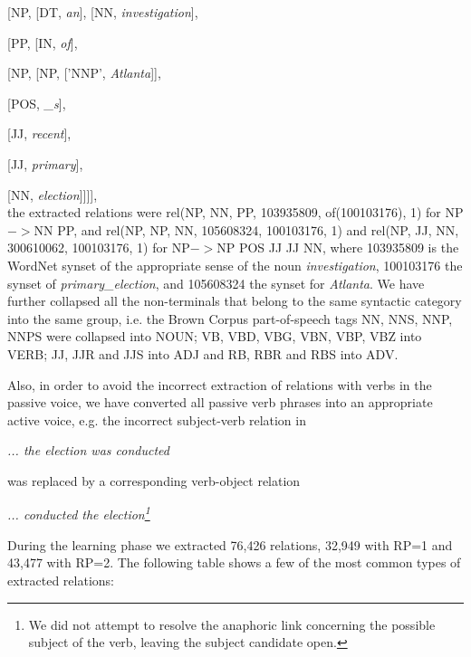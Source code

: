 \hspace*{2cm}
        [NP, [DT, {\it an}], [NN, {\it investigation}],

\hspace*{2cm}\hspace*{2cm}
                [PP, [IN, {\it of}],

\hspace*{2cm}\hspace*{2cm}\hspace*{2cm}
                        [NP, [NP, ['NNP', {\it Atlanta}]],

\hspace*{2cm}\hspace*{2cm}\hspace*{2cm}
                        [POS, {\it \_s}],

\hspace*{2cm}\hspace*{2cm}\hspace*{2cm}
                        [JJ, {\it recent}],

\hspace*{2cm}\hspace*{2cm}\hspace*{2cm}
                        [JJ, {\it primary}],

\hspace*{2cm}\hspace*{2cm}\hspace*{2cm}
                        [NN, {\it election}]]]],\\


\noindent
the extracted relations were rel(NP, NN, PP, 103935809, of(100103176), 1) for NP$->$NN PP, and
rel(NP, NP, NN, 105608324, 100103176, 1) and rel(NP, JJ, NN, 300610062, 100103176, 1) for NP$->$NP POS JJ JJ NN, where 103935809 is the WordNet synset of the appropriate sense of the noun {\it investigation}, 100103176 the synset of {\it primary\_election}, and 105608324 the synset for {\it Atlanta}. We have further collapsed all the non-terminals that belong to the same syntactic category into the same group, i.e. the Brown Corpus part-of-speech tags NN, NNS, NNP, NNPS were collapsed into NOUN; VB, VBD, VBG, VBN, VBP, VBZ into VERB; JJ, JJR and JJS into ADJ and RB, RBR and RBS into ADV.

Also, in order to avoid the incorrect extraction of relations with verbs in the passive voice, we have converted all passive verb phrases into an appropriate active voice, e.g. the incorrect subject-verb relation in 
\begin{center}
{\it ... the election was conducted  }
\end{center}
was replaced by a corresponding verb-object relation
\begin{center}
{\it ... conducted the election\footnote{
We did not attempt to resolve the anaphoric link concerning the possible subject of the verb, leaving the subject candidate open.
}}
\end{center}
During the learning phase we extracted 76,426 relations, 32,949 with RP=1 and 43,477 with RP=2. The following table shows a few of the most common types of extracted relations:


